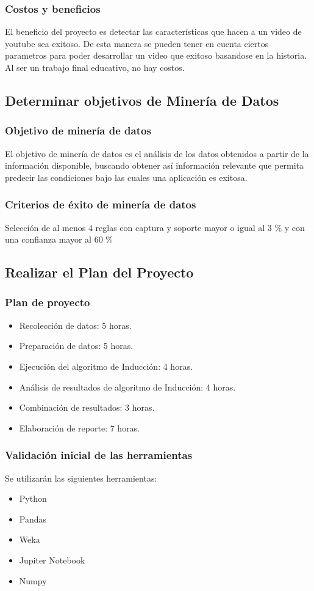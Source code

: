     \subsubsection{Costos y beneficios}
        El beneficio del proyecto es detectar las características que hacen a
        un video de youtube sea exitoso. De esta manera se pueden tener en
        cuenta ciertos parametros para poder desarrollar un video que exitoso
        basandose en la historia.
        Al ser un trabajo final educativo, no hay costos.

\subsection{Determinar objetivos de Minería de Datos}
    \subsubsection{Objetivo de minería de datos}
    El objetivo de minería de datos es el análisis de los datos obtenidos a
    partir de la información disponible, buscando obtener así información
    relevante que permita predecir las condiciones bajo las cuales una
    aplicación es exitosa.
    \subsubsection{Criterios de éxito de minería de datos}
    Selección de al menos 4 reglas con captura y soporte mayor o igual al 3 \%
    y con una confianza mayor al 60 \%

\subsection{Realizar el Plan del Proyecto}
    \subsubsection{Plan de proyecto}
        \begin{itemize}
            \item Recolección de datos: 5 horas.
            \item Preparación de datos: 5 horas.
            \item Ejecución del algoritmo de Inducción: 4 horas.
            \item Análisis de resultados de algoritmo de Inducción: 4 horas.
            \item Combinación de resultados: 3 horas.
            \item Elaboración de reporte: 7 horas.
        \end{itemize}
    \subsubsection{Validación inicial de las herramientas}
        Se utilizarán las siguientes herramientas:
        \begin{itemize}
            \item Python
            \item Pandas
            \item Weka
            \item Jupiter Notebook
            \item Numpy
        \end{itemize}
